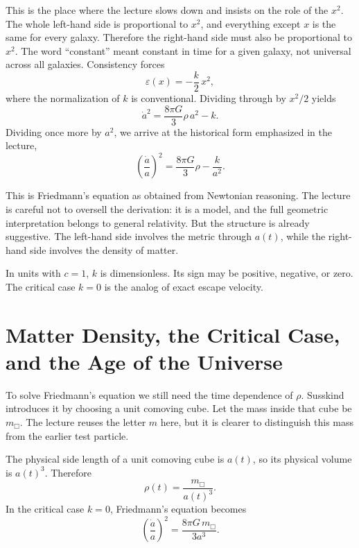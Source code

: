 This is the place where the lecture slows down and insists on the role of the \(x^2\). The whole left-hand side is proportional to \(x^2\), and everything except \(x\) is the same for every galaxy. Therefore the right-hand side must also be proportional to \(x^2\). The word ``constant'' meant constant in time for a given galaxy, not universal across all galaxies. Consistency forces
\begin{equation}
\varepsilon(x)=-\frac{k}{2}\,x^2,
\end{equation}
where the normalization of \(k\) is conventional. Dividing through by \(x^2/2\) yields
\begin{equation}
\dot a^2=\frac{8\pi G}{3}\rho\,a^2-k.
\end{equation}
Dividing once more by \(a^2\), we arrive at the historical form emphasized in the lecture,
\begin{equation}
\left(\frac{\dot a}{a}\right)^2=\frac{8\pi G}{3}\rho-\frac{k}{a^2}.
\end{equation}

This is Friedmann's equation as obtained from Newtonian reasoning. The lecture is careful not to oversell the derivation: it is a model, and the full geometric interpretation belongs to general relativity. But the structure is already suggestive. The left-hand side involves the metric through \(a(t)\), while the right-hand side involves the density of matter.

In units with \(c=1\), \(k\) is dimensionless. Its sign may be positive, negative, or zero. The critical case \(k=0\) is the analog of exact escape velocity.

\section{Matter Density, the Critical Case, and the Age of the Universe}

To solve Friedmann's equation we still need the time dependence of \(\rho\). Susskind introduces it by choosing a unit comoving cube. Let the mass inside that cube be \(m_{\Box}\). The lecture reuses the letter \(m\) here, but it is clearer to distinguish this mass from the earlier test particle.

The physical side length of a unit comoving cube is \(a(t)\), so its physical volume is \(a(t)^3\). Therefore
\begin{equation}
\rho(t)=\frac{m_{\Box}}{a(t)^3}.
\end{equation}
In the critical case \(k=0\), Friedmann's equation becomes
\begin{equation}
\left(\frac{\dot a}{a}\right)^2=\frac{8\pi G\,m_{\Box}}{3a^3}.
\end{equation}

